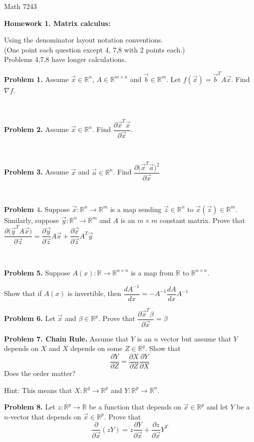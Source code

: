 \documentclass[11pt]{amsart}
\theoremstyle{definition}
\newcommand{\R}{\mathbb{R}}
\newcommand{\va}{\vec{a}}
\newcommand{\vb}{\vec{b}}
\newcommand{\vx}{\vec{x}}
\newcommand{\vy}{\vec{y}}
\newcommand{\vz}{\vec{z}}
\begin{document}
 \noindent
 
 
 Math 7243 
 
 \begin{center}
  \textbf{Homework 1.  Matrix calculus: } 
 \end{center}

Using
the denominator layout notation conventions.
\ \\
(One point each question except 4, 7,8 with 2 points each.)\\
Problems 4,7,8 have longer calculations.
  
\textbf{Problem 1. } Assume $\vx\in \R^n$,  $A\in \R^{m\times n}$ and $\vb\in \R^m$. Let $f(\vx)=\vb^T A \vx$. Find  $\nabla f$. 

\
 
 
\textbf{Problem 2. } Assume $\vx\in \R^n$. Find $\dfrac{\partial \vx^T\vx}{\partial \vx}$.
 
 \
 
 
\textbf{Problem 3. } Assume $\vx$ and $\va\in \R^n$. Find $\dfrac{\partial \big(\vx^T\va\big)^2}{\partial \vx}$
 
 
 \
 
\textbf{Problem $4$.} Suppose $\vx: \R^n\to \R^m$ is a map  sending $\vz\in \R^n$ to  $\vx(\vz)\in \R^m$. Similarly, 
suppose $\vy: \R^n\to \R^m$ and $A$ is an $m\times m$ constant matrix.
Prove that $\dfrac{\partial \big(\vy^TA\vx\big)}{\partial \vz}=
\dfrac{\partial \vy}{\partial \vz} A \vx+ \dfrac{\partial \vx}{\partial \vz} A^T \vy
$ 
 
\  
 
\textbf{Problem 5.}  Suppose $A(x): \R\to \R^{n\times n}$ is a map from $\R$ to $\R^{n
\times n}.$ 

Show that if $A(x)$ is invertible, then $
\dfrac{dA^{-1}}{dx}=-A^{-1} \dfrac{dA}{dx} A^{-1}
$
 
 
 \textbf{Problem 6. }
 Let $\vx$ and $\beta\in \R^p$. Prove that 
 $
\dfrac{\partial \vx^T\beta}{\partial \vx}=\beta 
  $
 
 
  \textbf{Problem 7. Chain Rule.}
 Assume that $Y$ is an $n$ vector but assume that $Y$ depends on $X$ and $X$ depends on
some $Z \in \R^q$. Show that
 $$
 \dfrac{\partial  Y}{\partial Z}= 
  \dfrac{\partial  X}{\partial Z}
   \dfrac{\partial  Y}{\partial X}
 $$
 Does the order matter? 
 
 Hint: This means that $X: \R^q\to \R^p$ and $Y: \R^p\to \R^n$.
 
  \textbf{Problem 8. } Let $z:\R^p 
  \to \R$ be a function that depends on $\vx\in \R^p$ and let $Y$ be a $n$-vector that depends on $\vx\in \R^p$. Prove that
   $$
 \dfrac{\partial  }{\partial \vx} (z Y)=z
  \dfrac{\partial  Y}{\partial \vx}+
   \dfrac{\partial z}{\partial \vx} Y^T
 $$
   
  
 
 
 
 
\end{document}

